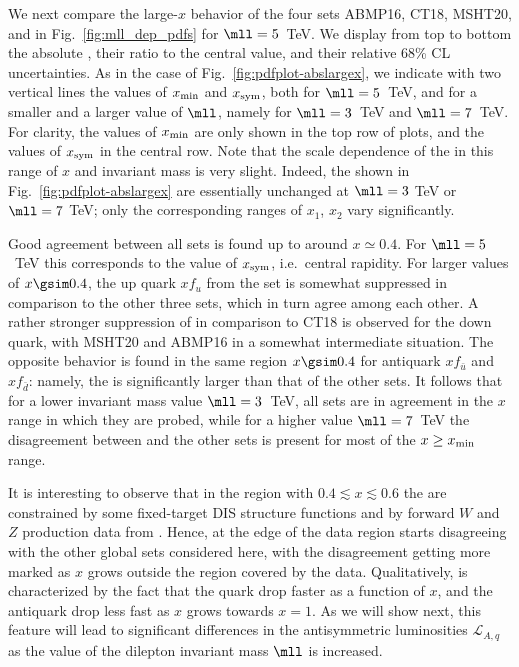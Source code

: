 We next compare the large-$x$ behavior 
of the four \pdf sets ABMP16, CT18, MSHT20, and  in Fig.~\ref{fig:mll_dep_pdfs}
for $\mll=5$~TeV.
%
We display from top to bottom the absolute \pdfs, their ratio to the central  value, and
their relative 68\% CL uncertainties.
%
As in the case of Fig.~\ref{fig:pdfplot-abslargex}, we indicate with two vertical lines
the values of $x_{\rm min}$ and $x_{\rm  sym}$,
both for $\mll=5$~TeV, and for a smaller and a larger value of $\mll$,
namely for $\mll=3$~TeV and  $\mll=7$~TeV.
%
For clarity, the values of $x_{\rm min}$ are only shown 
in the top row of plots, and the values of  $x_{\rm  sym}$ in the
central row. Note that the scale dependence
of the \pdfs in this range of  $x$ and invariant mass is very
slight. Indeed, the \pdfs shown in Fig.~\ref{fig:pdfplot-abslargex} are
essentially unchanged at $\mll=3$ TeV or  $\mll=7$ TeV;  only the
corresponding ranges of $x_1$, $x_2$ vary significantly.

Good agreement between all \pdf
sets is found up to around $x\simeq 0.4$.
%
For $\mll=5$~TeV this corresponds to the value of $x_{\rm sym}$, i.e.\ central rapidity.
%
For larger values of $x\gsim 0.4$, the up  quark \pdf $xf_u$ from the
 set is somewhat
suppressed in comparison to the other three sets, which in turn agree
among each other.
%
A rather stronger suppression of
  in comparison to  CT18 is observed for the down quark, with
MSHT20 and ABMP16 in a somewhat intermediate situation.
%
The opposite behavior is found in the same region $x\gsim 0.4$ for
antiquark \pdfs  $xf_{\bar{u}}$ and $xf_{\bar{d}}$:
namely, the  \pdf is significantly  larger than that of the other sets.
It follows that for a lower invariant mass value  $\mll = 3$~TeV, all
\pdf sets are  in agreement in the $x$ range in which they are probed,
while for a higher value  $\mll = 7$~TeV the 
disagreement between  and the other \pdf sets is present for
most of the $x\ge x_{\rm min}$ range.

It is interesting to observe that in the region with $0.4\lesssim x\lesssim
0.6$ the \pdfs are constrained by some fixed-target DIS structure functions and
by forward $W$ and $Z$ production data from \lhcb.
Hence, at the edge of the data region  starts disagreeing with the
other global \pdf sets considered here, with the disagreement getting more
marked as $x$ grows outside the region covered by the data.
%
Qualitatively,  is characterized by the fact that the
quark \pdfs drop faster as a function of $x$, and the antiquark \pdfs
drop less fast as $x$ grows towards $x=1$.
As we will show next, this feature will lead to significant differences
in the antisymmetric \pdf luminosities $\mathcal{L}_{A,q}$ as the value of
the dilepton invariant mass $\mll$ is increased.

